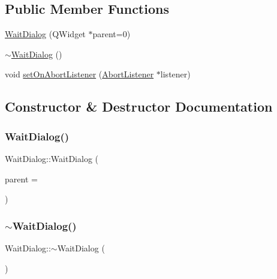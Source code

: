 \subsection*{Public Member Functions}
\begin{DoxyCompactItemize}
\item 
\mbox{\hyperlink{class_wait_dialog_ad3f283fe9282bf9375d9dd6b7fa1347f}{Wait\+Dialog}} (Q\+Widget $\ast$parent=0)
\item 
\mbox{\hyperlink{class_wait_dialog_aba6a51c0919ceace4caba12be14e5015}{$\sim$\+Wait\+Dialog}} ()
\item 
void \mbox{\hyperlink{class_wait_dialog_a3734bb8b41bd6758b8b4c185e7f42d62}{set\+On\+Abort\+Listener}} (\mbox{\hyperlink{class_abort_listener}{Abort\+Listener}} $\ast$listener)
\end{DoxyCompactItemize}


\subsection{Constructor \& Destructor Documentation}
\mbox{\label{class_wait_dialog_ad3f283fe9282bf9375d9dd6b7fa1347f}} 
\subsubsection{\texorpdfstring{WaitDialog()}{WaitDialog()}}
{\footnotesize\ttfamily Wait\+Dialog\+::\+Wait\+Dialog (\begin{DoxyParamCaption}\item[{Q\+Widget $\ast$}]{parent = {} }\end{DoxyParamCaption})\hspace{0.3cm}{\ttfamily [explicit]}}

\mbox{\label{class_wait_dialog_aba6a51c0919ceace4caba12be14e5015}} 
\subsubsection{\texorpdfstring{$\sim$WaitDialog()}{~WaitDialog()}}
{\footnotesize\ttfamily Wait\+Dialog\+::$\sim$\+Wait\+Dialog (\begin{DoxyParamCaption}{ }\end{DoxyParamCaption})}



